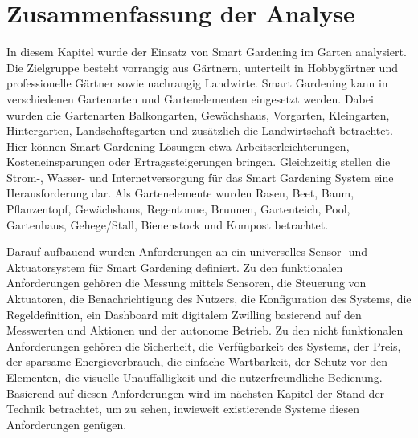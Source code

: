 \section{Zusammenfassung der Analyse}
In diesem Kapitel wurde der Einsatz von Smart Gardening im Garten analysiert.
Die Zielgruppe besteht vorrangig aus Gärtnern, unterteilt in Hobbygärtner und professionelle Gärtner sowie nachrangig Landwirte.
Smart Gardening kann in verschiedenen Gartenarten und Gartenelementen eingesetzt werden.
Dabei wurden die Gartenarten Balkongarten, Gewächshaus, Vorgarten, Kleingarten, Hintergarten, Landschaftsgarten und zusätzlich die Landwirtschaft betrachtet.
Hier können Smart Gardening Lösungen etwa Arbeitserleichterungen, Kosteneinsparungen oder Ertragssteigerungen bringen.
Gleichzeitig stellen die Strom-, Wasser- und Internetversorgung für das Smart Gardening System eine Herausforderung dar.
Als Gartenelemente wurden Rasen, Beet, Baum, Pflanzentopf, Gewächshaus, Regentonne, Brunnen, Gartenteich, Pool, Gartenhaus, Gehege/Stall, Bienenstock und Kompost betrachtet.

Darauf aufbauend wurden Anforderungen an ein universelles Sensor- und Aktuatorsystem für Smart Gardening definiert.
Zu den funktionalen Anforderungen gehören die Messung mittels Sensoren, die Steuerung von Aktuatoren, die Benachrichtigung des Nutzers, die Konfiguration des Systems, die Regeldefinition, ein Dashboard mit digitalem Zwilling basierend auf den Messwerten und Aktionen und der autonome Betrieb.
Zu den nicht funktionalen Anforderungen gehören die Sicherheit, die Verfügbarkeit des Systems, der Preis, der sparsame Energieverbrauch, die einfache Wartbarkeit, der Schutz vor den Elementen, die visuelle Unauffälligkeit und die nutzerfreundliche Bedienung.
Basierend auf diesen Anforderungen wird im nächsten Kapitel der Stand der Technik betrachtet, um zu sehen, inwieweit existierende Systeme diesen Anforderungen genügen.